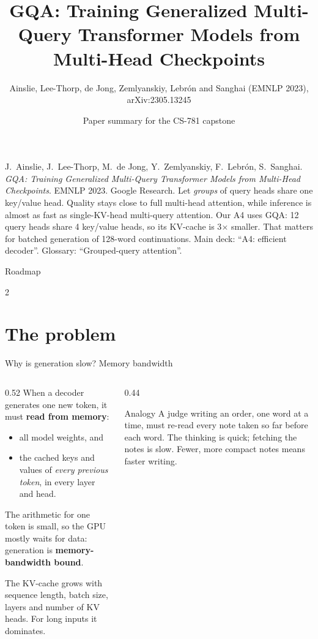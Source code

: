 \documentclass[aspectratio=169,11pt]{beamer}
\title[GQA]{GQA: Training Generalized Multi-Query Transformer Models from Multi-Head Checkpoints}
\subtitle{Ainslie, Lee-Thorp, de Jong, Zemlyanskiy, Lebrón and Sanghai (EMNLP 2023), arXiv:2305.13245}
\author[Paper summary]{Paper summary for the CS-781 capstone}
\date{}
\begin{document}
\begin{frame}\titlepage\end{frame}

\paperglance
{J.\ Ainslie, J.\ Lee-Thorp, M.\ de Jong, Y.\ Zemlyanskiy, F.\ Lebrón, S.\ Sanghai. \emph{GQA: Training Generalized Multi-Query Transformer Models from Multi-Head Checkpoints}. EMNLP 2023. Google Research.}
{Let \emph{groups} of query heads share one key/value head. Quality stays close to full multi-head attention, while inference is almost as fast as single-KV-head multi-query attention.}
{Our A4 uses GQA: 12 query heads share 4 key/value heads, so its KV-cache is 3$\times$ smaller. That matters for batched generation of 128-word continuations.}
{Main deck: ``A4: efficient decoder''. Glossary: ``Grouped-query attention''.}

\begin{frame}{Roadmap}
  \begin{multicols}{2}\small\tableofcontents\end{multicols}
\end{frame}

\section{The problem}

\begin{frame}{Why is generation slow? Memory bandwidth}
  \begin{columns}[T]
    \begin{column}{0.52\textwidth}
      \small
      When a decoder generates one new token, it must \textbf{read from memory}:
      \begin{itemize}
        \item all model weights, and
        \item the cached keys and values of \emph{every previous token}, in every layer and head.
      \end{itemize}
      The arithmetic for one token is small, so the GPU mostly waits for data: generation is \textbf{memory-bandwidth bound}.
      \vspace{1mm}

      The KV-cache grows with sequence length, batch size, layers and number of KV heads. For long inputs it dominates.
    \end{column}
    \begin{column}{0.44\textwidth}
      \begin{exampleblock}{Analogy}
        \small
        A judge writing an order, one word at a time, must re-read every note taken so far before each word.
        The thinking is quick; fetching the notes is slow. Fewer, more compact notes means faster writing.
      \end{exampleblock}
    \end{column}
  \end{columns}
\end{frame}
\end{document}
